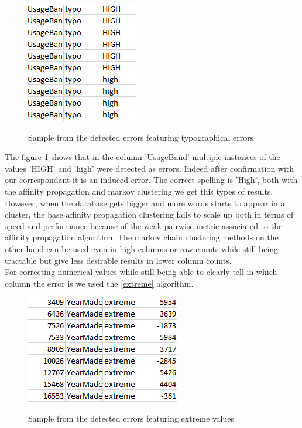 \documentclass{article}
\begin{document}
\begin{figure}[h]
    \centering
    \includegraphics[scale=0.5]{picture/exp_typo.png}
    \label{fig:exp_typo}
    \caption{Sample from the detected errors featuring typographical errors}
\end{figure}
The figure \ref{fig:exp_typo} shows that in the column 'UsageBand' multiple instances of the values 'HIGH' and 'high' were detected as errors. Indeed after confirmation with our correspondant it is an induced error. The correct spelling is 'High', both with the affinity propagation and markov clustering we get this types of results. However, when the database gets bigger and more words starts to appear in a cluster, the base affinity propagation clustering fails to scale up both in terms of speed and performance because of the weak pairwise metric associated to the affinity propagation algorithm. The markov chain clustering methods on the other hand can be used even in high columns or row counts while still being tractable but give less desirable results in lower column counts. \\

For correcting numerical values while still being able to clearly tell in which column the error is we used the \ref{extreme} algorithm.

\begin{figure}[h]
    \centering
    \includegraphics[scale=0.5]{picture/exp_extreme.png}
    \label{fig:exp_extreme}
    \caption{Sample from the detected errors featuring extreme values}
\end{figure}
\end{document}
